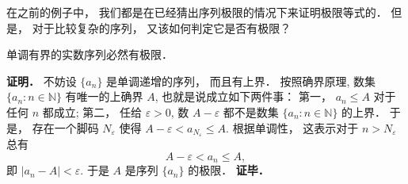 

在之前的例子中， 我们都是在已经猜出序列极限的情况下来证明极限等式的． 但是， 对于比较复杂的序列， 又该如何判定它是否有极限？

\begin{theorem}{}
单调有界的实数序列必然有极限．
\end{theorem}
\textbf{证明．} 不妨设 $\{a_n\}$ 是单调递增的序列， 而且有上界． 按照确界原理, 数集 $\{a_n:n\in\mathbb{N}\}$ 有唯一的上确界 $A$, 也就是说成立如下两件事： 第一， $a_n\leq A$ 对于任何 $n$ 都成立; 第二， 任给 $\varepsilon>0$, 数 $A-\varepsilon$ 都不是数集 $\{a_n:n\in\mathbb{N}\}$ 的上界． 于是， 存在一个脚码 $N_\varepsilon$ 使得 $A-\varepsilon<a_{N_\varepsilon}\leq A$. 根据单调性， 这表示对于 $n>N_\varepsilon$ 总有
\[A-\varepsilon<a_n\leq A,\]
即 $|a_n-A|<\varepsilon$. 于是 $A$ 是序列 $\{a_n\}$ 的极限． \textbf{证毕．}

